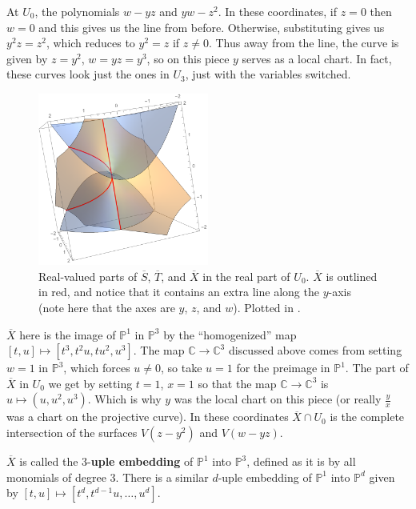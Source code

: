 \documentclass[12pt]{article}
\newcommand{\cx}{\mathbb{C}}
\newcommand{\p}{\mathbb{P}}
\theoremstyle{definition}
\theoremstyle{remark}
\begin{document}
At $U_0$, the polynomials $w - yz$ and $yw - z^2$. In these coordinates, if $z = 0$ then $w = 0$ and this gives us the line from before. Otherwise, substituting gives us $y^2 z = z^2$, which reduces to $y^2 = z$ if $z \neq 0$. Thus away from the line, the curve is given by $z = y^2$, $w = yz = y^3$, so on this piece $y$ serves as a local chart. In fact, these curves look just the ones in $U_3$, just with the variables switched.
\begin{figure}[H]
    \centering
    \includegraphics[width=0.5\textwidth]{18.pdf}
    \caption{Real-valued parts of $\overline{S}$, $\overline{T}$, and $\overline{X}$ in the real part of $U_0$. $\overline{X}$ is outlined in red, and notice that it contains an extra line along the $y$-axis (note here that the axes are $y$, $z$, and $w$). Plotted in \cite{Mathematica}.}
    \label{fig:Fig18}
\end{figure}
$\overline{X}$ here is the image of $\p^1$ in $\p^3$ by the ``homogenized'' map $[t,u] \mapsto [t^3 , t^2u , t u^2, u^3]$. The map $\cx \to \cx^3$ discussed above comes from setting $w = 1$ in $\p^3$, which forces $u \neq 0$, so take $u = 1$ for the preimage in $\p^1$. The part of $\overline{X}$ in $U_0$ we get by setting $t = 1$, $x = 1$ so that the map $\cx \to \cx^3$ is $u \mapsto (u , u^2 , u^3)$. Which is why $y$ was the local chart on this piece (or really $\frac{y}{x}$ was a chart on the projective curve). In these coordinates $\overline{X} \cap U_0$ is the complete intersection of the surfaces $V(z - y^2)$ and $V(w - yz)$.

$\overline{X}$ is called the 3-\textbf{uple embedding} of $\p^1$ into $\p^3$, defined as it is by all monomials of degree 3. There is a similar $d$-uple embedding of $\p^1$ into $\p^d$ given by $[t,u] \mapsto [t^d , t^{d-1}u , \dotsc , u^d]$.
\end{document}
